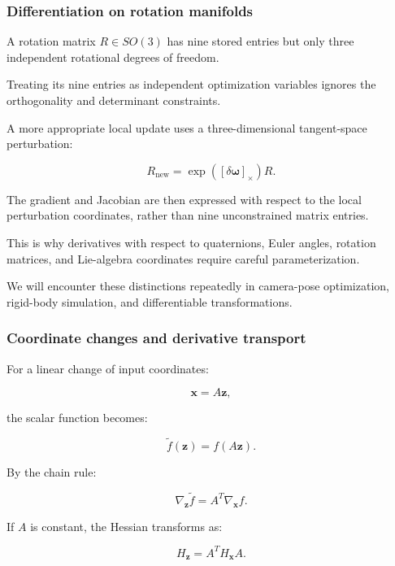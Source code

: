 \subsubsection{Differentiation on rotation manifolds}\label{02-foundations-ii-ch021-differentiation-on-rotation-manifolds}

\hypertarget{02-foundations-ii-ch021-differentiation-on-rotation-manifolds}{}

A rotation matrix \(R\in SO(3)\) has nine stored entries but only three independent rotational degrees of freedom.

Treating its nine entries as independent optimization variables ignores the orthogonality and determinant constraints.

A more appropriate local update uses a three-dimensional tangent-space perturbation:

\[
R_{\text{new}}=\exp([\delta\boldsymbol\omega]_\times)R.
\]

The gradient and Jacobian are then expressed with respect to the local perturbation coordinates, rather than nine unconstrained matrix entries.

This is why derivatives with respect to quaternions, Euler angles, rotation matrices, and Lie-algebra coordinates require careful parameterization.

We will encounter these distinctions repeatedly in camera-pose optimization, rigid-body simulation, and differentiable transformations.

\subsubsection{Coordinate changes and derivative transport}\label{02-foundations-ii-ch021-coordinate-changes-and-derivative-transport}

\hypertarget{02-foundations-ii-ch021-coordinate-changes-and-derivative-transport}{}

For a linear change of input coordinates:

\[
\mathbf x=A\mathbf z,
\]

the scalar function becomes:

\[
\tilde f(\mathbf z)=f(A\mathbf z).
\]

By the chain rule:

\[
\boxed{ \nabla_{\mathbf z}\tilde f = A^T\nabla_{\mathbf x}f }.
\]

If \(A\) is constant, the Hessian transforms as:

\[
\boxed{ H_{\mathbf z}=A^TH_{\mathbf x}A }.
\]

